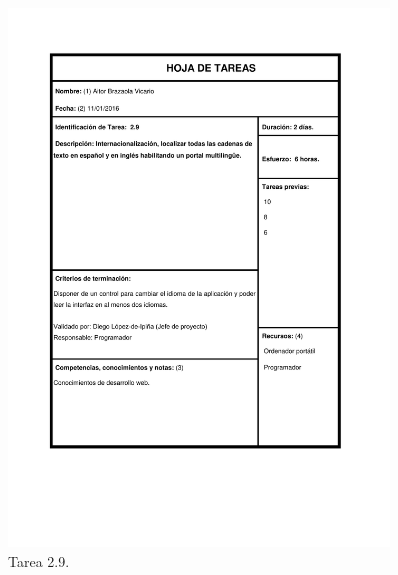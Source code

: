\documentclass{DeustoFDP}
\begin{document}
\begin{figure}[H]
	\centering
	\includegraphics[width=0.9\textwidth]{fig/Tareas/29}
	\caption{Tarea 2.9.}
	\label{fig:t29}
\end{figure}
\end{document}
